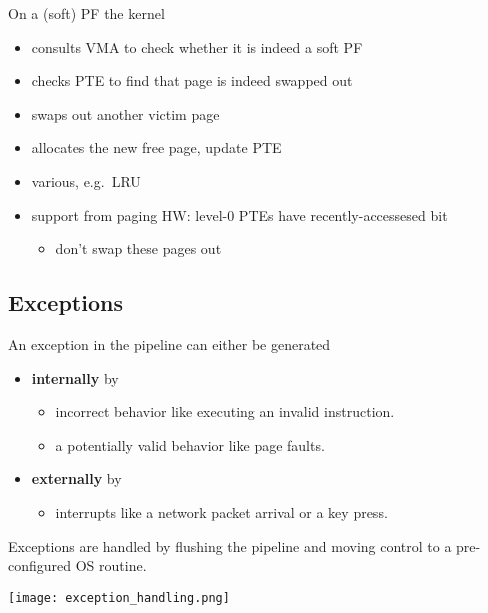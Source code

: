 \newpar{}

On a (soft) PF the kernel
\begin{itemize}
    \item consults VMA to check whether it is indeed a soft PF
    \item checks PTE to find that page is indeed swapped out
    \item swaps out another victim page
    \item allocates the new free page, update PTE
\end{itemize}

\newpar{}

\begin{itemize}
    \item various, e.g.\ LRU
    \item support from paging HW: level-0 PTEs have recently-accessesed bit
          \begin{itemize}
              \item don't swap these pages out
          \end{itemize}
\end{itemize}

\subsection{Exceptions}\label{exceptions}
An exception in the pipeline can either be generated
\begin{itemize}
    \item \textbf{internally} by
          \begin{itemize}
              \item incorrect behavior like executing an invalid instruction.
              \item a potentially valid behavior like page faults.
          \end{itemize}
    \item \textbf{externally} by
          \begin{itemize}
              \item interrupts like a network packet arrival or a key press.
          \end{itemize}
\end{itemize}

Exceptions are handled by flushing the pipeline and moving control to a pre-configured OS routine.

\begin{center}
    \texttt{[image: exception\_handling.png]}
\end{center}

